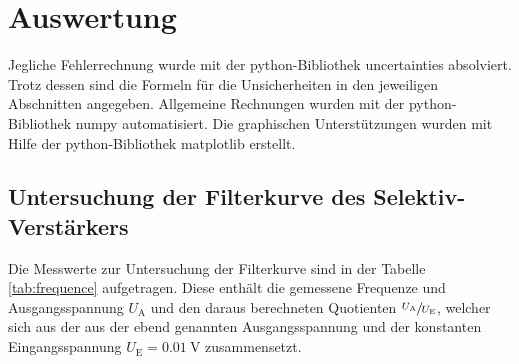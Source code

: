 \section{Auswertung}
\label{sec:Auswertung}
Jegliche Fehlerrechnung wurde mit der python-Bibliothek uncertainties \cite{uncertainties} absolviert.
Trotz dessen sind die Formeln für die Unsicherheiten in den jeweiligen Abschnitten angegeben.
Allgemeine Rechnungen wurden mit der python-Bibliothek numpy \cite{numpy} automatisiert. 
Die graphischen Unterstützungen wurden mit Hilfe der python-Bibliothek matplotlib \cite{matplotlib} erstellt.\\
\subsection{Untersuchung der Filterkurve des Selektiv-Verstärkers}
Die Messwerte zur Untersuchung der Filterkurve sind in der Tabelle \ref{tab:frequence} aufgetragen. 
Diese enthält die gemessene Frequenze und  Ausgangsspannung $U_\text{A}$ und den daraus berechneten Quotienten $\sfrac{U_\text{A}}{U_\text{E}}$, welcher sich aus der
aus der ebend genannten Ausgangsspannung und der konstanten Eingangsspannung $U_\text{E} = \SI{0.01}{\volt}$ zusammensetzt.
